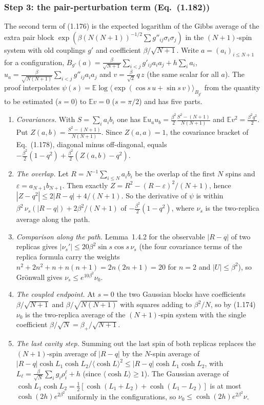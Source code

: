 \subsubsection{Step 3: the pair-perturbation term (Eq.~(1.182))}
The second term of (1.176) is the expected logarithm of the Gibbs average of the extra pair block
$\exp(\beta(N(N+1))^{-1/2}\sum g''_{ij}\sigma_i\sigma_j)$ in the $(N+1)$-spin system with old couplings
$g'$ and coefficient $\beta/\sqrt{N+1}$.  Write $a=(a_i)_{i\le N+1}$ for a configuration,
$B_{g'}(a)=\tfrac{\beta}{\sqrt{N+1}}\sum_{i<j}g'_{ij}a_ia_j+h\sum_ia_i$,
$u_a=\tfrac{\beta}{\sqrt{N(N+1)}}\sum_{i<j}g''_{ij}a_ia_j$ and $v=\tfrac{\beta}{\sqrt2}\,q\,z$ (the same scalar for all
$a$).  The proof interpolates $\psi(s)=\mathbb E\log\langle\exp(\cos s\,u+\sin s\,v)\rangle_{B_{g'}}$
from the quantity to be estimated ($s=0$) to $\mathbb E v=0$ ($s=\pi/2$) and has five parts.
\begin{enumerate}
\item \emph{Covariances.}  With $S=\sum_ia_ib_i$ one has
  $\mathbb E u_au_b=\tfrac{\beta^2}{2}\tfrac{S^2-(N+1)}{N(N+1)}$ and $\mathbb E v^2=\tfrac{\beta^2q^2}{2}$.
  Put $Z(a,b)=\tfrac{S^2-(N+1)}{N(N+1)}$.  Since $Z(a,a)=1$, the covariance bracket of Eq.~(1.178),
  diagonal minus off-diagonal, equals $-\tfrac{\beta^2}{2}(1-q^2)+\tfrac{\beta^2}{2}(Z(a,b)-q^2)$.
\item \emph{The overlap.}  Let $R=N^{-1}\sum_{i\le N}a_ib_i$ be the overlap of the first $N$ spins and
  $\varepsilon=a_{N+1}b_{N+1}$.  Then exactly $Z=R^2-(R-\varepsilon)^2/(N+1)$, hence
  $|Z-q^2|\le2|R-q|+4/(N+1)$.  So the derivative of $\psi$ is within
  $\beta^2\,\nu_s(|R-q|)+2\beta^2/(N+1)$ of $-\tfrac{\beta^2}{2}(1-q^2)$, where $\nu_s$ is the
  two-replica average along the path.
\item \emph{Comparison along the path.}  Lemma~1.4.2 for the observable $|R-q|$ of two replicas gives
  $|\nu_s'|\le20\beta^2\sin s\cos s\,\nu_s$ (the four covariance terms of the replica formula carry the
  weights $n^2+2n^2+n+n(n+1)=2n(2n+1)=20$ for $n=2$ and $|U|\le\beta^2$), so Gr\"onwall gives
  $\nu_s\le e^{10\beta^2}\nu_0$.
\item \emph{The coupled endpoint.}  At $s=0$ the two Gaussian blocks have coefficients $\beta/\sqrt{N+1}$
  and $\beta/\sqrt{N(N+1)}$ with squares adding to $\beta^2/N$, so by (1.174) $\nu_0$ is the two-replica
  average of the $(N+1)$-spin system with the single coefficient $\beta/\sqrt N=\beta_+/\sqrt{N+1}$.
\item \emph{The last cavity step.}  Summing out the last spin of both replicas replaces the
  $(N+1)$-spin average of $|R-q|$ by the $N$-spin average of $|R-q|\cosh L_1\cosh L_2/\langle\cosh L\rangle^2
  \le|R-q|\cosh L_1\cosh L_2$, with $L_\ell=\tfrac{\beta}{\sqrt N}\sum_ig_i\rho^\ell_i+h$ (since
  $\langle\cosh L\rangle\ge1$).  The Gaussian average of $\cosh L_1\cosh L_2=\tfrac12[\cosh(L_1+L_2)+\cosh(L_1-L_2)]$
  is at most $\cosh(2h)e^{2\beta^2}$ uniformly in the configurations, so $\nu_0\le\cosh(2h)e^{2\beta^2}\nu$.
\end{enumerate}
